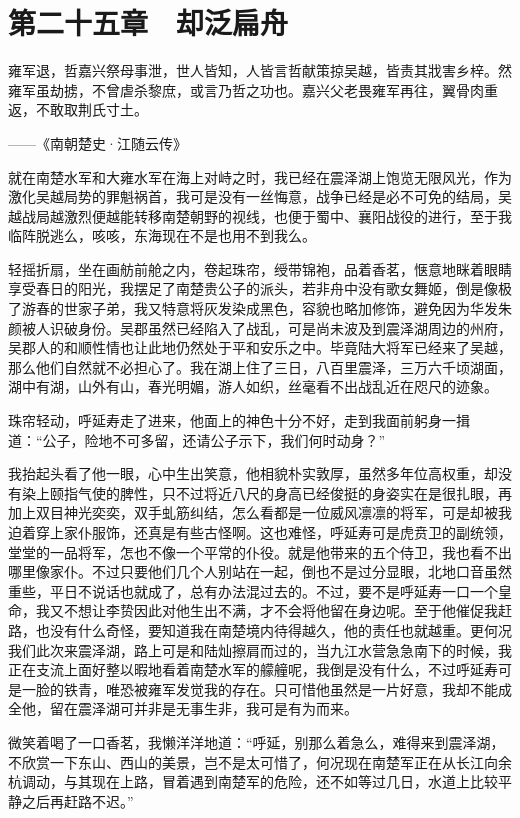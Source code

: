 \chapter{第二十五章　却泛扁舟}

雍军退，哲嘉兴祭母事泄，世人皆知，人皆言哲献策掠吴越，皆责其戕害乡梓。然雍军虽劫掳，不曾虐杀黎庶，或言乃哲之功也。嘉兴父老畏雍军再往，翼骨肉重返，不敢取荆氏寸土。

——《南朝楚史·江随云传》

就在南楚水军和大雍水军在海上对峙之时，我已经在震泽湖上饱览无限风光，作为激化吴越局势的罪魁祸首，我可是没有一丝悔意，战争已经是必不可免的结局，吴越战局越激烈便越能转移南楚朝野的视线，也便于蜀中、襄阳战役的进行，至于我临阵脱逃么，咳咳，东海现在不是也用不到我么。

轻摇折扇，坐在画舫前舱之内，卷起珠帘，绶带锦袍，品着香茗，惬意地眯着眼睛享受春日的阳光，我摆足了南楚贵公子的派头，若非舟中没有歌女舞姬，倒是像极了游春的世家子弟，我又特意将灰发染成黑色，容貌也略加修饰，避免因为华发朱颜被人识破身份。吴郡虽然已经陷入了战乱，可是尚未波及到震泽湖周边的州府，吴郡人的和顺性情也让此地仍然处于平和安乐之中。毕竟陆大将军已经来了吴越，那么他们自然就不必担心了。我在湖上住了三日，八百里震泽，三万六千顷湖面，湖中有湖，山外有山，春光明媚，游人如织，丝毫看不出战乱近在咫尺的迹象。

珠帘轻动，呼延寿走了进来，他面上的神色十分不好，走到我面前躬身一揖道：“公子，险地不可多留，还请公子示下，我们何时动身？”

我抬起头看了他一眼，心中生出笑意，他相貌朴实敦厚，虽然多年位高权重，却没有染上颐指气使的脾性，只不过将近八尺的身高已经俊挺的身姿实在是很扎眼，再加上双目神光奕奕，双手虬筋纠结，怎么看都是一位威风凛凛的将军，可是却被我迫着穿上家仆服饰，还真是有些古怪啊。这也难怪，呼延寿可是虎贲卫的副统领，堂堂的一品将军，怎也不像一个平常的仆役。就是他带来的五个侍卫，我也看不出哪里像家仆。不过只要他们几个人别站在一起，倒也不是过分显眼，北地口音虽然重些，平日不说话也就成了，总有办法混过去的。不过，要不是呼延寿一口一个皇命，我又不想让李贽因此对他生出不满，才不会将他留在身边呢。至于他催促我赶路，也没有什么奇怪，要知道我在南楚境内待得越久，他的责任也就越重。更何况我们此次来震泽湖，路上可是和陆灿擦肩而过的，当九江水营急急南下的时候，我正在支流上面好整以暇地看着南楚水军的艨艟呢，我倒是没有什么，不过呼延寿可是一脸的铁青，唯恐被雍军发觉我的存在。只可惜他虽然是一片好意，我却不能成全他，留在震泽湖可并非是无事生非，我可是有为而来。

微笑着喝了一口香茗，我懒洋洋地道：“呼延，别那么着急么，难得来到震泽湖，不欣赏一下东山、西山的美景，岂不是太可惜了，何况现在南楚军正在从长江向余杭调动，与其现在上路，冒着遇到南楚军的危险，还不如等过几日，水道上比较平静之后再赶路不迟。”

